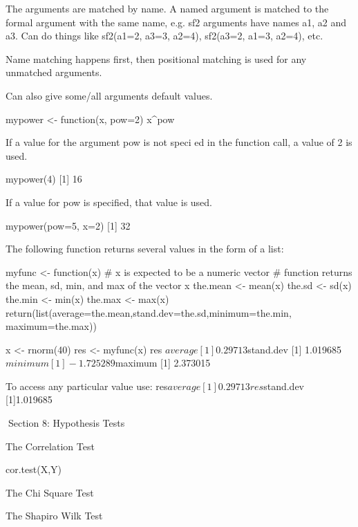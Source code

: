 The arguments are matched by name. A named argument is matched to the formal argument with the same name, e.g.
sf2 arguments have names a1, a2 and a3. Can do things like sf2(a1=2, a3=3, a2=4), sf2(a3=2, a1=3, a2=4), etc.
 
Name matching happens first, then positional matching is used for any unmatched arguments.
 

Can also give some/all arguments default values.
 
mypower <- function(x, pow=2){
x^pow
}
 
If a value for the argument pow is not speci ed in the function call, a value of 2 is used.
 


mypower(4)
[1] 16




 
If a value for pow is specified, that value is used.
 



mypower(pow=5, x=2)
[1] 32
 




The following function returns several values in the form of a list:



myfunc <- function(x)
{
# x is expected to be a numeric vector
# function returns the mean, sd, min, and max of the vector x
the.mean <- mean(x)
the.sd <- sd(x)
the.min <- min(x)
the.max <- max(x)
return(list(average=the.mean,stand.dev=the.sd,minimum=the.min,
maximum=the.max))
}
 



x <- rnorm(40)
res <- myfunc(x)
res
$average
[1] 0.29713
$stand.dev
[1] 1.019685
$minimum
[1] -1.725289
$maximum
[1] 2.373015






 


To access any particular value use:
res$average
[1] 0.29713
res$stand.dev
[1]1.019685







 
Section 8: Hypothesis Tests

The Correlation Test

cor.test(X,Y)


The Chi Square Test





The Shapiro Wilk Test


